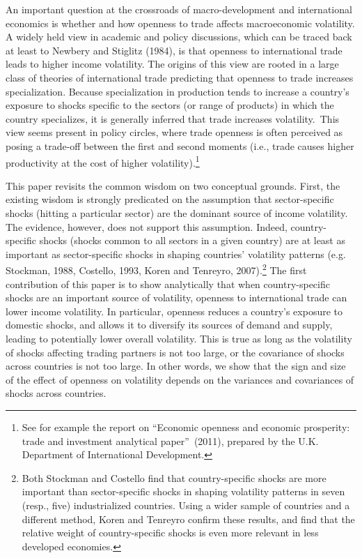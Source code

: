 \documentclass[12pt]{article}
\begin{document}
An important question at the crossroads of macro-development and
international economics is whether and how openness to trade affects
macroeconomic volatility. A widely held view in academic and policy
discussions, which can be traced back at least to Newbery and Stiglitz
(1984), is that openness to international trade leads to higher income
volatility. The origins of this view are rooted in a large class of theories
of international trade predicting that openness to trade increases
specialization. Because specialization in production tends to increase a
country's exposure to shocks specific to the sectors (or range of products)
in which the country specializes, it is generally inferred that trade
increases volatility.\ This view seems present in policy circles, where
trade openness is often perceived as posing a trade-off between the first
and second moments (i.e., trade causes higher productivity at the cost of
higher volatility).\footnote{%
See for example the report on \textquotedblleft Economic openness and
economic prosperity: trade and investment analytical
paper\textquotedblright\ (2011), prepared by the U.K. Department of
International Development.}

This paper revisits the common wisdom on two conceptual grounds. First, the
existing wisdom is strongly predicated on the assumption that
sector-specific shocks (hitting a particular sector) are the dominant source
of income volatility. The evidence, however, does not support this
assumption. Indeed, country-specific shocks (shocks common to all sectors in
a given country) are at least as important as sector-specific shocks in
shaping countries' volatility patterns (e.g. Stockman, 1988, Costello, 1993,
Koren and Tenreyro, 2007).\footnote{%
Both Stockman and Costello find that country-specific shocks are more
important than sector-specific shocks in shaping volatility patterns in
seven (resp., five) industrialized countries. Using a wider sample of
countries and a different method, Koren and Tenreyro confirm these results,
and find that the relative weight of country-specific shocks is even more
relevant in less developed economies.} The first contribution of this paper
is to show analytically that when country-specific shocks are an important
source of volatility, openness to international trade can lower income
volatility. In particular, openness reduces a country's exposure to domestic
shocks, and allows it to diversify its sources of demand and supply, leading
to potentially lower overall volatility. This is true as long as the
volatility of shocks affecting trading partners is not too large, or the
covariance of shocks across countries is not too large. In other words, we
show that the sign and size of the effect of openness on volatility depends
on the variances and covariances of shocks across countries.
\end{document}
